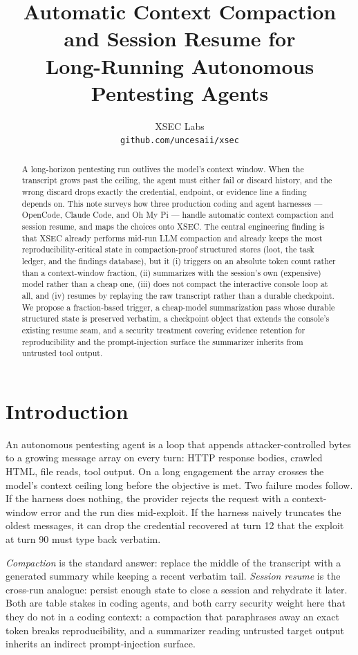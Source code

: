 \documentclass[11pt]{article}
\title{Automatic Context Compaction and Session Resume for\\Long-Running Autonomous Pentesting Agents}
\author{
  XSEC Labs \\
  \texttt{github.com/uncesaii/xsec}
}
\date{}
\begin{document}
\maketitle

\begin{abstract}
A long-horizon pentesting run outlives the model's context window. When the
transcript grows past the ceiling, the agent must either fail or discard
history, and the wrong discard drops exactly the credential, endpoint, or
evidence line a finding depends on. This note surveys how three production
coding and agent harnesses --- OpenCode, Claude Code, and Oh My Pi --- handle
automatic context compaction and session resume, and maps the choices onto XSEC.
The central engineering finding is that XSEC already performs mid-run LLM
compaction and already keeps the most reproducibility-critical state in
compaction-proof structured stores (loot, the task ledger, and the findings
database), but it (i) triggers on an absolute token count rather than a
context-window fraction, (ii) summarizes with the session's own (expensive)
model rather than a cheap one, (iii) does not compact the interactive console
loop at all, and (iv) resumes by replaying the raw transcript rather than a
durable checkpoint. We propose a fraction-based trigger, a cheap-model
summarization pass whose durable structured state is preserved verbatim, a
checkpoint object that extends the console's existing resume seam, and a
security treatment covering evidence retention for reproducibility and the
prompt-injection surface the summarizer inherits from untrusted tool output.
\end{abstract}

\section{Introduction}

An autonomous pentesting agent is a loop that appends attacker-controlled bytes
to a growing message array on every turn: HTTP response bodies, crawled HTML,
file reads, tool output. On a long engagement the array crosses the model's
context ceiling long before the objective is met. Two failure modes follow. If
the harness does nothing, the provider rejects the request with a context-window
error and the run dies mid-exploit. If the harness naively truncates the oldest
messages, it can drop the credential recovered at turn 12 that the exploit at
turn 90 must type back verbatim.

\emph{Compaction} is the standard answer: replace the middle of the transcript
with a generated summary while keeping a recent verbatim tail. \emph{Session
resume} is the cross-run analogue: persist enough state to close a session and
rehydrate it later. Both are table stakes in coding agents, and both carry
security weight here that they do not in a coding context: a compaction that
paraphrases away an exact token breaks reproducibility, and a summarizer reading
untrusted target output inherits an indirect prompt-injection surface.
\end{document}
